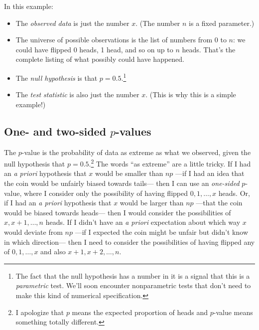 In this example:
\begin{itemize}
\item The \emph{observed data} is just the number $x$. (The number $n$ is a fixed parameter.)
\item The universe of possible observations is the list of numbers from 0 to $n$: we could have flipped 0 heads, 1 head, and so on up to $n$ heads. That's the complete listing of what possibly could have happened.
\item The \emph{null hypothesis} is that $p = 0.5$.\footnote{The fact that the null hypothesis has a number in it is a signal that this is a \emph{parametric} test. We'll soon encounter nonparametric tests that don't need to make this kind of numerical specification.}
\item The \emph{test statistic} is also just the number $x$. (This is why this is a simple example!)
\end{itemize}

\subsection{One- and two-sided $p$-values}

The $p$-value is the probability of data as extreme as what we observed, given the null hypothesis that $p = 0.5$.\footnote{I apologize that $p$ means the expected proportion of heads and $p$-value means something totally different.} The words ``as extreme'' are a little tricky. If I had an \textit{a priori} hypothesis that $x$ would be smaller than $np$ ---if I had an idea that the coin would be unfairly biased towards tails--- then I can use an \emph{one-sided} $p$-value, where I consider only the possibility of having flipped $0, 1, \ldots, x$ heads. Or, if I had an \emph{a priori} hypothesis that $x$ would be larger than $np$ ---that the coin would be biased towards heads--- then I would consider the possibilities of $x, x+1, \ldots, n$ heads. If I didn't have an \textit{a priori} expectation about which way $x$ would deviate from $np$ ---if I expected the coin might be unfair but didn't know in which direction--- then I need to consider the possibilities of having flipped any of $0, 1, \ldots, x$ and also $x+1, x+2, \ldots, n$.

